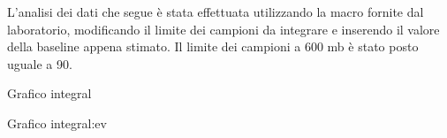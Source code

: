 L'analisi dei dati che segue è stata effettuata utilizzando la macro fornite dal laboratorio,
modificando il limite dei campioni da integrare e inserendo il valore della baseline appena stimato.
Il limite dei campioni a 600 mb è stato posto uguale a 90.

\begin{grafico}
 \centering
 \caption{Grafico integral} 
 \label{gr:misura600_integral} 
\end{grafico}

 \begin{grafico}
 \centering
 \caption{Grafico integral:ev} 
 \label{gr:misura600_integral_ev} 
\end{grafico}


